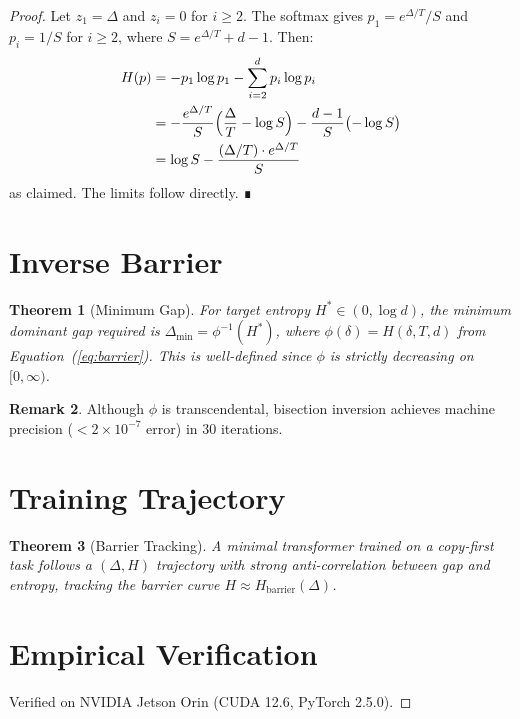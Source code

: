 \documentclass[11pt,a4paper]{amsart}
\theoremstyle{plain}
\newtheorem{theorem}{Theorem}[section]
\theoremstyle{definition}
\newtheorem{remark}[theorem]{Remark}
\begin{document}
\begin{proof}
Let $z_1 = \Delta$ and $z_i = 0$ for $i \geq 2$. The softmax gives
$p_1 = e^{\Delta/T} / S$ and $p_i = 1/S$ for $i \geq 2$, where $S =
e^{\Delta/T} + d - 1$. Then:
\begin{align*}
H(p) &= -p_1 \log p_1 - \sum_{i=2}^d p_i \log p_i \\
&= -\frac{e^{\Delta/T}}{S}\Bigl(\frac{\Delta}{T} - \log S\Bigr) - \frac{d-1}{S}\bigl(-\log S\bigr) \\
&= \log S - \frac{(\Delta/T) \cdot e^{\Delta/T}}{S}
\end{align*}
as claimed. The limits follow directly. ∎

\section{Inverse Barrier}

\begin{theorem}[Minimum Gap]\label{thm:inverse}
For target entropy $H^* \in (0, \log d)$, the minimum dominant gap
required is $\Delta_{\min} = \phi^{-1}(H^*)$, where $\phi(\delta) =
H(\delta, T, d)$ from Equation~(\ref{eq:barrier}). This is
well-defined since $\phi$ is strictly decreasing on $[0, \infty)$.
\end{theorem}

\begin{remark}
Although $\phi$ is transcendental, bisection inversion achieves
machine precision ($< 2 \times 10^{-7}$ error) in 30 iterations.
\end{remark}

\section{Training Trajectory}

\begin{theorem}[Barrier Tracking]\label{thm:trajectory}
A minimal transformer trained on a copy-first task follows a
$(\Delta, H)$ trajectory with strong anti-correlation between gap
and entropy, tracking the barrier curve $H \approx
H_{\text{barrier}}(\Delta)$.
\end{theorem}

\section{Empirical Verification}

Verified on NVIDIA Jetson Orin (CUDA 12.6, PyTorch 2.5.0).


\end{proof}
\end{document}
